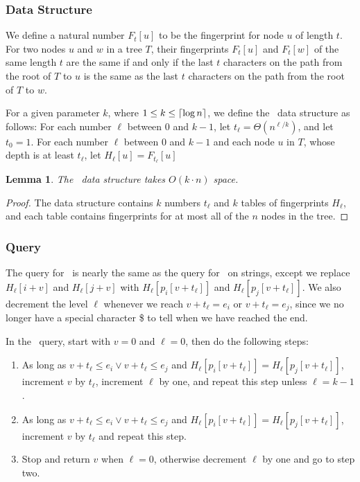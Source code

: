 \documentclass[a4]{article}
\newtheorem{lemma}{Lemma}
\begin{document}
\subsubsection{Data Structure}

We define a natural number $F_t[u]$ to be the fingerprint for node $u$ of length $t$. For two nodes $u$ and $w$ in a tree $T$, their fingerprints $F_t[u]$ and $F_t[w]$ of the same length $t$ are the same if and only if the last $t$ characters on the path from the root of $T$ to $u$ is the same as the last $t$ characters on the path from the root of $T$ to $w$.

For a given parameter $k$, where $1\leq k \leq \lceil\log n\rceil$, we define the \tfprintk\ data structure as follows: For each number $\ell$ between $0$ and $k-1$, let $t_\ell=\Theta(n^{\ell/k})$, and let $t_0 = 1$. For each number $\ell$ between $0$ and $k-1$ and each node $u$ in $T$, whose depth is at least $t_\ell$, let $H_\ell[u] = F_{t_\ell}[u]$

\begin{lemma}
The \tfprintk\ data structure takes $O(k\cdot n)$ space.
\end{lemma}
\begin{proof}
The data structure contains $k$ numbers $t_\ell$ and $k$ tables of fingerprints $H_\ell$, and each table contains fingerprints for at most all of the $n$ nodes in the tree.
\end{proof}

\subsubsection{Query}

The query for \tfprintk\ is nearly the same as the query for \fprintk\ on strings, except we replace $H_\ell[i+v]$ and $H_\ell[j+v]$ with $H_\ell[p_i[v+t_\ell]]$ and $H_\ell[p_j[v+t_\ell]]$. We also decrement the level $\ell$ whenever we reach $v+t_\ell=e_i$ or $v+t_\ell=e_j$, since we no longer have a special character \$ to tell when we have reached the end.

In the \tfprintk\ query, start with $v=0$ and $\ell=0$, then do the following steps:
\begin{samepage}
\begin{enumerate}
\item As long as $v+t_\ell\leq e_i\lor v+t_\ell\leq e_j$ and $H_\ell[p_i[v+t_\ell]] = H_\ell[p_j[v+t_\ell]]$, increment $v$ by $t_\ell$, increment $\ell$ by one, and repeat this step unless $\ell = k-1$.
\item As long as  $v+t_\ell\leq e_i\lor v+t_\ell\leq e_j$ and $H_\ell[p_i[v+t_\ell]] = H_\ell[p_j[v+t_\ell]]$, increment $v$ by $t_\ell$ and repeat this step.
\item Stop and return $v$ when $\ell = 0$, otherwise decrement $\ell$ by one and go to step two.
\end{enumerate}
\end{samepage}
\end{document}
